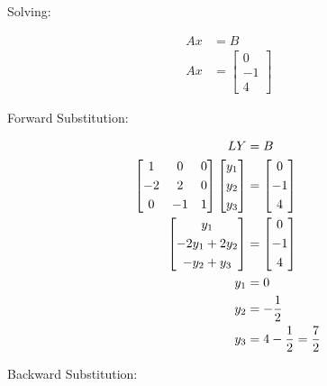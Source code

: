 	Solving:

	\begin{align}
		Ax &= B& \\
		Ax &= \begin{bmatrix}
				0 \\[0.3em]
				-1 \\[0.3em]
				4
			\end{bmatrix}&
	\label{eq:52ax}
	\end{align}

	Forward Substitution:

	\begin{align}
		LY &= B& \\
		\begin{bmatrix}
			1 & 0 & 0 \\[0.3em]
			-2 & 2 & 0 \\[0.3em]
			0 & -1 & 1
		\end{bmatrix}
		\begin{bmatrix}
			y_{1} \\[0.3em]
			y_{2} \\[0.3em]
			y_{3}
		\end{bmatrix} &= \begin{bmatrix}
				0 \\[0.3em]
				-1 \\[0.3em]
				4
			\end{bmatrix}& \notag \\
		\begin{bmatrix}
			y_{1} \\[0.3em]
			-2y_{1} + 2y_{2} \\[0.3em]
			-y_{2} + y_{3}
		\end{bmatrix} &= \begin{bmatrix}
				0 \\[0.3em]
				-1 \\[0.3em]
				4
			\end{bmatrix}& \notag \\
		y_{1} &= 0& \\
		y_{2} &= -\frac{1}{2}& \\
		y_{3} &= 4 - \frac{1}{2} = \frac{7}{2}&
	\label{eq:52y}
	\end{align}

	Backward Substitution:

